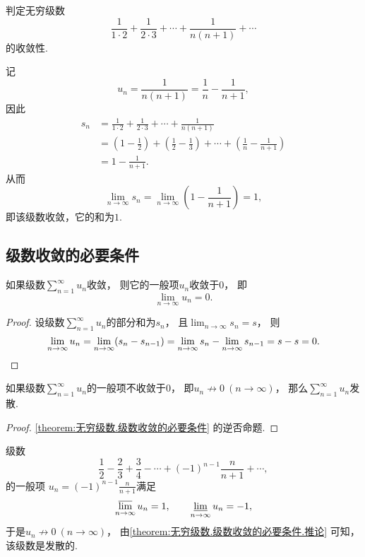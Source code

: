 \begin{example}
判定无穷级数\[
\frac{1}{1\cdot2}+\frac{1}{2\cdot3}+\dotsb+\frac{1}{n(n+1)}+\dotsb
\]的收敛性.
\begin{solution}
记\[
	u_n = \frac{1}{n(n+1)} = \frac{1}{n}-\frac{1}{n+1},
\]
因此\begin{align*}
	s_n &= \frac{1}{1\cdot2}+\frac{1}{2\cdot3}+\dotsb+\frac{1}{n(n+1)} \\
	&= \left(1-\frac{1}{2}\right)+\left(\frac{1}{2}-\frac{1}{3}\right)
	+\dotsb+\left(\frac{1}{n}-\frac{1}{n+1}\right) \\
	&= 1-\frac{1}{n+1}.
\end{align*}
从而\[
	\lim_{n\to\infty} s_n
	= \lim_{n\to\infty} \left(1-\frac{1}{n+1}\right)
	= 1,
\]
即该级数收敛，它的和为\(1\).
\end{solution}
\end{example}

\subsection{级数收敛的必要条件}
\begin{proposition}[级数收敛的必要条件]\label{theorem:无穷级数.级数收敛的必要条件}
如果级数\(\sum_{n=1}^\infty u_n\)收敛，
则它的一般项\(u_n\)收敛于\(0\)，
即\[
	\lim_{n\to\infty} u_n = 0.
\]
\begin{proof}
设级数\(\sum_{n=1}^\infty u_n\)的部分和为\(s_n\)，
且\(\lim_{n\to\infty} s_n = s\)，
则\[
	\lim_{n\to\infty} u_n
	= \lim_{n\to\infty}(s_n - s_{n-1})
	= \lim_{n\to\infty} s_n - \lim_{n\to\infty} s_{n-1}
	= s - s
	= 0.
	\qedhere
\]
\end{proof}
\end{proposition}

\begin{corollary}\label{theorem:无穷级数.级数收敛的必要条件.推论}
如果级数\(\sum_{n=1}^\infty u_n\)的一般项不收敛于\(0\)，
即\(u_n \not\to 0\ (n\to\infty)\)，
那么\(\sum_{n=1}^\infty u_n\)发散.
\begin{proof}
\cref{theorem:无穷级数.级数收敛的必要条件} 的逆否命题.
\end{proof}
\end{corollary}

\begin{example}
级数\[
	\frac12-\frac23+\frac34-\dotsb+(-1)^{n-1}\frac{n}{n+1}+\dotsb,
\]的一般项
\(u_n = (-1)^{n-1} \frac{n}{n+1}\)满足\[
	\varlimsup_{n\to\infty} u_n = 1,
	\qquad
	\varliminf_{n\to\infty} u_n = -1,
\]
于是\(u_n \not\to 0\ (n\to\infty)\)，
由\cref{theorem:无穷级数.级数收敛的必要条件.推论} 可知，该级数是发散的.
\end{example}

